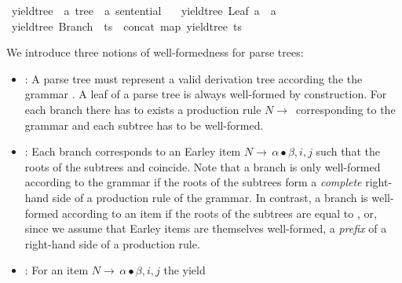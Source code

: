 \begin{isabellebody}
\isanewline
{}\isamarkupfalse%
\ yield{\isacharunderscore}{\kern0pt}tree\ {\isacharcolon}{\kern0pt}{\isacharcolon}{\kern0pt}\ {\isachardoublequoteopen}{\isacharprime}{\kern0pt}a\ tree\ {\isasymRightarrow}\ {\isacharprime}{\kern0pt}a\ sentential{\isachardoublequoteclose}\ \isanewline
\ \ {\isachardoublequoteopen}yield{\isacharunderscore}{\kern0pt}tree\ {\isacharparenleft}{\kern0pt}Leaf\ a{\isacharparenright}{\kern0pt}\ {\isacharequal}{\kern0pt}\ {\isacharbrackleft}{\kern0pt}a{\isacharbrackright}{\kern0pt}{\isachardoublequoteclose}\isanewline
{\isacharbar}{\kern0pt}\ {\isachardoublequoteopen}yield{\isacharunderscore}{\kern0pt}tree\ {\isacharparenleft}{\kern0pt}Branch\ {\isacharunderscore}{\kern0pt}\ ts{\isacharparenright}{\kern0pt}\ {\isacharequal}{\kern0pt}\ concat\ {\isacharparenleft}{\kern0pt}map\ yield{\isacharunderscore}{\kern0pt}tree\ ts{\isacharparenright}{\kern0pt}{\isachardoublequoteclose}%
\begin{isamarkuptext}%
We introduce three notions of well-formedness for parse trees:
\begin{itemize}
  \item {}: A parse tree must represent a valid derivation tree according the the grammar \isa{{\isasymG}}.
    A leaf of a parse tree is always well-formed by construction. For each branch 
    there has to exists a production rule $N \rightarrow \, $  corresponding to the grammar \isa{{\isasymG}} and each subtree  has to be well-formed.
  \item {}: Each branch  corresponds to an Earley item
    $N \rightarrow \, \alpha \bullet \beta, i, j$ such that the roots of the subtrees  and
    \isa{{\isasymalpha}} coincide. Note that a branch is only well-formed according to the grammar if
    the roots of the subtrees form a \textit{complete} right-hand side of a production rule of the grammar.
    In contrast, a branch is well-formed according to an item if the roots of the subtrees are equal
    to \isa{{\isasymalpha}}, or, since we assume that Earley items are themselves well-formed, a \textit{prefix}
    of a right-hand side of a production rule.
  \item {}: For an item $N \rightarrow \, \alpha \bullet \beta, i, j$ the yield

\end{itemize}
\end{isamarkuptext}
\end{isabellebody}

